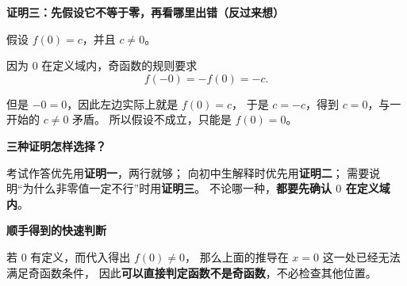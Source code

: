 \begin{proofbox}
\textbf{\textcolor{CProof}{证明三：先假设它不等于零，再看哪里出错（反过来想）}}


  \begin{description}[style=nextline, leftmargin=2.8em, labelsep=0.5em, itemsep=0.55em]
    \item[\textbf{第一步：作一个相反的假设。}]
      假设 $f(0)=c$，并且 $c\ne0$。
    \item[\textbf{第二步：使用奇函数条件。}]
      因为 $0$ 在定义域内，奇函数的规则要求
      \[
        f(-0)=-f(0)=-c.
      \]
    \item[\textbf{第三步：发现矛盾。}]
      但是 $-0=0$，因此左边实际上就是 $f(0)=c$，
      于是 $c=-c$，得到 $c=0$，与一开始的 $c\ne0$ 矛盾。
      所以假设不成立，只能是 $\boxed{f(0)=0}$。
  \end{description}

  \medskip
  \textbf{\textcolor{CProof}{三种证明怎样选择？}}

  考试作答优先用\textbf{证明一}，两行就够；
  向初中生解释时优先用\textbf{证明二}；
  需要说明“为什么非零值一定不行”时用\textbf{证明三}。
  不论哪一种，\textbf{都要先确认 $0$ 在定义域内}。

  \medskip
  \textbf{\textcolor{CProof}{顺手得到的快速判断}}

  若 $0$ 有定义，而代入得出 $f(0)\ne0$，
  那么上面的推导在 $x=0$ 这一处已经无法满足奇函数条件，
  因此\textbf{可以直接判定函数不是奇函数}，不必检查其他位置。
\end{proofbox}
